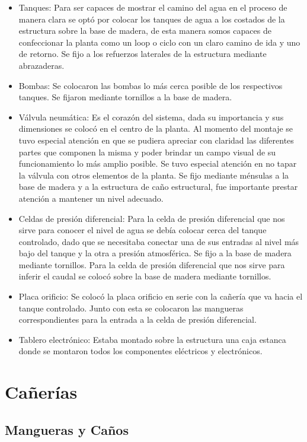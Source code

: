  \begin{itemize}
  \item Tanques:
  Para ser capaces de mostrar el camino del agua en el proceso de manera clara se optó por colocar los
  tanques de agua a los costados de la estructura sobre la base de madera, de esta manera somos capaces
  de confeccionar la planta como un loop o ciclo con un claro camino de ida y uno de retorno.
  Se fijo a los refuerzos laterales de la estructura mediante abrazaderas.
  \item Bombas:
  Se colocaron las bombas lo más cerca posible de los respectivos tanques. Se fijaron mediante tornillos
  a la base de madera.
  \item Válvula neumática:
  Es el corazón del sistema, dada su importancia y sus dimensiones se colocó en el centro de la planta.
  Al momento del montaje se tuvo especial atención en que se pudiera apreciar con claridad las diferentes
  partes que componen la misma y poder brindar un campo visual de su funcionamiento lo más amplio posible.
  Se tuvo especial atención en no tapar la válvula con otros elementos de la planta.
  Se fijo mediante ménsulas a la base de madera y a la estructura de caño estructural, fue importante
  prestar atención a mantener un nivel adecuado.
  \item Celdas de presión diferencial:
  Para la celda de presión diferencial que nos sirve para conocer el nivel de agua se debía colocar
  cerca del tanque controlado, dado que se necesitaba conectar una de sus entradas al nivel más bajo del
  tanque y la otra a presión atmosférica. Se fijo a la base de madera mediante tornillos.
  Para la celda de presión diferencial que nos sirve para inferir el caudal se colocó sobre la base de
  madera mediante tornillos.
  \item Placa orificio:
  Se colocó la placa orificio en serie con la cañería que va hacia el tanque controlado. Junto con esta 
  se colocaron las mangueras correspondientes para la entrada a la celda de presión diferencial.
  \item Tablero electrónico:
  Estaba montado sobre la estructura una caja estanca donde se montaron todos los componentes eléctricos
  y electrónicos.
 \end{itemize}

\section{Cañerías}
\label{sec:Canerias}

\subsection{Mangueras y Caños}

